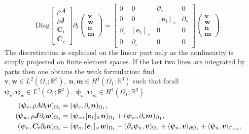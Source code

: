 \documentclass[11pt,a4paper]{article}
\newcommand{\innerproduct}[3][\Omega]{(#2, #3)_{#1}}
\newcommand{\boundary}[3][\partial\Omega]{\langle #2, #3\rangle_{#1}}
\begin{document}
{\begin{equation}\label{eq:timoshenkp_beam}
\mathrm{Diag}
\begin{bmatrix}
\rho A \\
\rho \bm{J} \\
\bm{C}_t\\
\bm{C}_r
\end{bmatrix}
\partial_t
\begin{pmatrix}
\bm{v} \\
\bm{w} \\
\bm{n} \\
\bm{m}
\end{pmatrix}
=
\begin{bmatrix}
0 &  0 & \partial_s & 0 \\
0 & 0 & [\bm{e}_1]_{\times}  & \partial_s \\
\partial_s & [\bm{e}_1]_{\times} & 0 & 0 \\
0 & \partial_s  & 0 & 0
\end{bmatrix}
\begin{pmatrix}
\bm{v} \\
\bm{w} \\
\bm{n} \\
\bm{m}
\end{pmatrix}.
\end{equation}
The discretization is explained on the linear part only as the nonlinearity is simply projected on finite element spaces. If the last two lines are integrated by parts then one obtains the weak formulation: find $\bm{v}, \bm{w} \in L^2(\Omega_1; \mathbb{R}^3), \; \bm{n}, \bm{m} \in H^1(\Omega_1; \mathbb{R}^3)$ such that forall $\bm{\psi}_v, \bm{\psi}_w \in L^2(\Omega_1; \mathbb{R}^3), \; \bm{\psi}_n, \bm{\psi}_m \in H^1(\Omega_1; \mathbb{R}^3)$
\begin{equation}
\begin{aligned}
   \innerproduct[\Omega_1]{\bm{\psi}_v}{\rho A \partial_t \bm{v}} &= \innerproduct[\Omega_1]{\bm{\psi}_v}{\partial_s \bm{n}}, \\
    \innerproduct[\Omega_1]{\bm{\psi}_w}{\rho \bm{J} \partial_t \bm{w}} &= \innerproduct[\Omega_1]{\bm{\psi}_w}{[\bm{e}_1]_{\times} \bm{n}} + \innerproduct[\Omega_1]{\bm{\psi}_w}{\partial_s \bm{m}}, \\
    \innerproduct[\Omega_1]{\bm{\psi}_n}{\bm{C}_t \partial_t \bm{n}} &= \innerproduct[\Omega_1]{\bm{\psi}_n}{[\bm{e}_1]_{\times} \bm{w}} - \innerproduct[\Omega_1]{\partial_s \bm{\psi}_n}{\bm{v}} + \boundary[\partial \Omega_1]{\bm{\psi}_n }{\bm{v}} + \boundary[\Gamma_{\rm int}]{\bm{\psi}_n }{\bm{v}}, \\

\end{aligned}
\end{equation}}
\end{document}
